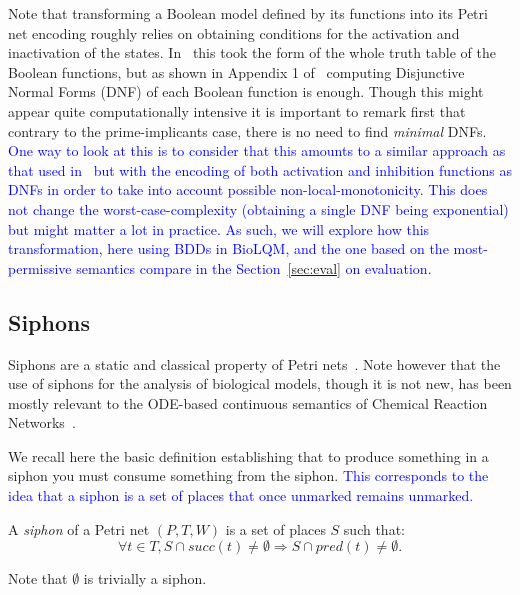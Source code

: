 \documentclass[runningheads]{llncs}
\newcommand{\revise}[1]{\textcolor{blue}{#1}}
\begin{document}
Note that transforming a Boolean model defined by its functions into its Petri net encoding roughly relies on obtaining conditions for the activation and inactivation of the states. In~\cite{chaouiya2004qualitative} this took the form of the whole truth table of the Boolean functions, but as shown in Appendix 1 of~\cite{chatain2014characterization} computing Disjunctive Normal Forms (DNF) of each Boolean function is enough.
Though this might appear quite computationally intensive it is important to remark first that contrary to the prime-implicants case, there is no need to find \emph{minimal} DNFs.
\revise{One way to look at this is to consider that this amounts to a similar approach as that used in~\cite{DBLP:conf/ictai/ChevalierFPZ19} but with the encoding of both activation and inhibition functions as DNFs in order to take into account possible non-local-monotonicity.
This does not change the worst-case-complexity (obtaining a single DNF being exponential) but might matter a lot in practice.
As such, we will explore how this transformation, here using BDDs in BioLQM, and the one based on the most-permissive semantics compare in the Section~\ref{sec:eval} on evaluation.}

\subsection{Siphons}

Siphons are a static and classical property of Petri nets~\cite{peterson1981petri}.
Note however that the use of siphons for the analysis of biological models, though it is not new, has been mostly relevant to the ODE-based continuous semantics of Chemical Reaction Networks~\cite{angeli2007petri,angeli2011persistence,degrand2020graphical}.

We recall here the basic definition establishing that to produce something in a siphon you must consume something from the siphon.
\revise{This corresponds to the idea that a siphon is a set of places that once unmarked remains unmarked.}

\begin{definition}

  A \emph{siphon} of a Petri net \((P, T, W)\) is a set of places \(S\) such that:
  \[\forall t\in T, S\cap succ(t)\not =\emptyset\Rightarrow S\cap pred(t)\not =\emptyset.\]

\end{definition}

Note that \(\emptyset\) is trivially a siphon.
\end{document}
